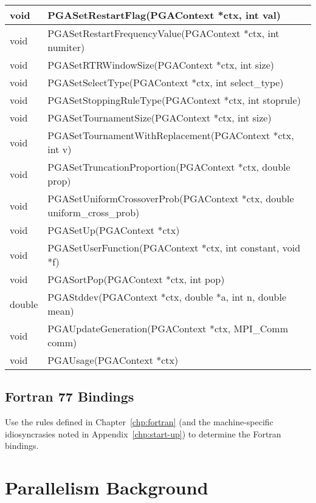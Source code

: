 \documentclass{report}
\begin{document}
\begin{tabular}{|l|l|}
void &  PGASetRestartFlag(PGAContext *ctx, int val) \\ \hline
void &  PGASetRestartFrequencyValue(PGAContext *ctx, int numiter) \\ \hline
void &  PGASetRTRWindowSize(PGAContext *ctx, int size) \\ \hline
void &  PGASetSelectType(PGAContext *ctx, int select\_type) \\ \hline
void &  PGASetStoppingRuleType(PGAContext *ctx, int stoprule) \\ \hline
void &  PGASetTournamentSize(PGAContext *ctx, int size) \\ \hline
void &  PGASetTournamentWithReplacement(PGAContext *ctx, int v) \\ \hline
void &  PGASetTruncationProportion(PGAContext *ctx, double prop) \\ \hline
void &  PGASetUniformCrossoverProb(PGAContext *ctx, double uniform\_cross\_prob)
\\ \hline
void &  PGASetUp(PGAContext *ctx) \\ \hline
void &  PGASetUserFunction(PGAContext *ctx, int constant, void *f) \\ \hline
void &  PGASortPop(PGAContext *ctx, int pop) \\ \hline
double &  PGAStddev(PGAContext *ctx, double *a, int n, double mean) \\ \hline
void &  PGAUpdateGeneration(PGAContext *ctx, MPI\_Comm comm) \\ \hline
void &  PGAUsage(PGAContext *ctx) \\ \hline
\end{tabular}


\section*{Fortran 77 Bindings}\label{app:bindings-fortran}

Use the rules defined in Chapter~\ref{chp:fortran} (and the machine-specific
idiosyncrasies noted in Appendix~\ref{chp:start-up}) to determine the Fortran
bindings.

\chapter{Parallelism Background}\label{app:par-background}
\end{document}
